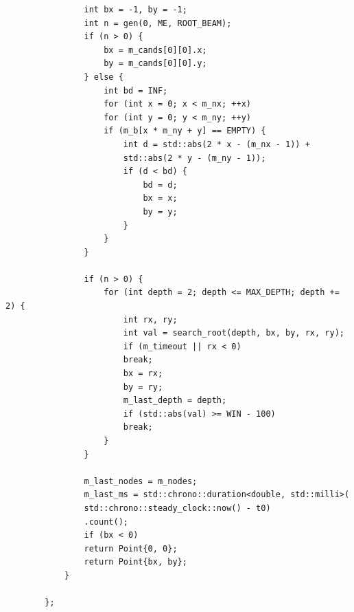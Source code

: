 \documentclass[14pt,a4paper]{extarticle}
\begin{document}
\begin{verbatim}
				int bx = -1, by = -1;
				int n = gen(0, ME, ROOT_BEAM);
				if (n > 0) {
					bx = m_cands[0][0].x; 
					by = m_cands[0][0].y;
				} else { 
					int bd = INF;
					for (int x = 0; x < m_nx; ++x)
					for (int y = 0; y < m_ny; ++y)
					if (m_b[x * m_ny + y] == EMPTY) {
						int d = std::abs(2 * x - (m_nx - 1)) + 
						std::abs(2 * y - (m_ny - 1));
						if (d < bd) {
							bd = d;
							bx = x;
							by = y;
						}
					}
				}
				
				if (n > 0) {
					for (int depth = 2; depth <= MAX_DEPTH; depth += 2) {
						int rx, ry;
						int val = search_root(depth, bx, by, rx, ry);
						if (m_timeout || rx < 0)
						break;
						bx = rx;
						by = ry;
						m_last_depth = depth;
						if (std::abs(val) >= WIN - 100)
						break; 
					}
				}
				
				m_last_nodes = m_nodes;
				m_last_ms = std::chrono::duration<double, std::milli>(
				std::chrono::steady_clock::now() - t0)
				.count();
				if (bx < 0)
				return Point{0, 0};
				return Point{bx, by};
			}
			
		}; 
	\end{verbatim}
	
	
\end{document}
